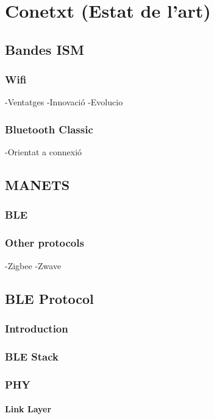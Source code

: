 \chapter{Conetxt (Estat de l'art)}\label{C:compaginacio}

\section{Bandes ISM}

\subsection{Wifi}
-Ventatges
-Innovació
-Evolucio

\subsection{Bluetooth Classic}
-Orientat a connexió



\section{MANETS}

\subsection{BLE}

\subsection{Other protocols}
-Zigbee
-Zwave


\section{BLE Protocol}
\subsection{Introduction}
\subsection{BLE Stack}
\subsection{PHY}
\subsubsection{Link Layer}
